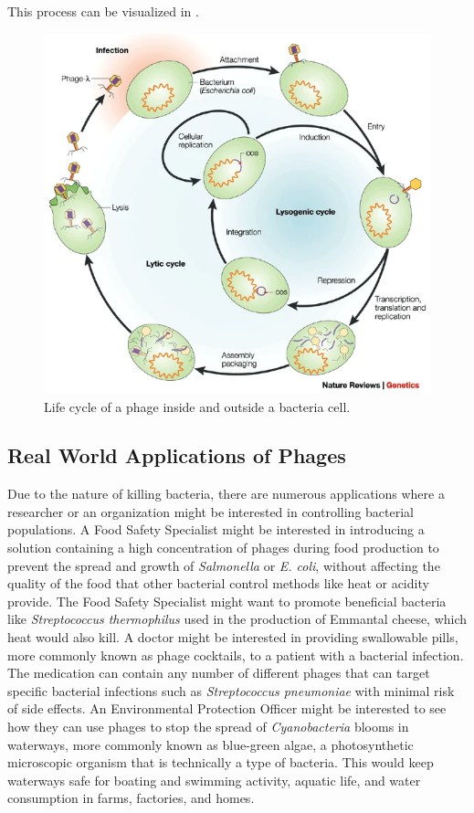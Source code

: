 This process can be visualized in . \cite{campbellFutureBacteriophageBiology2003}
\begin{figure}
    \centering
    \includegraphics[width=0.5\linewidth]{Chapters/Figures/phage_life_cycle.png}
    \caption{Life cycle of a phage inside and outside a bacteria cell.}
    \label{fig:phage_life_cycle}
\end{figure}

\subsection{Real World Applications of Phages}
Due to the nature of killing bacteria, there are numerous applications where a researcher or an organization might be interested in controlling bacterial populations. A Food Safety Specialist might be interested in introducing a solution containing a high concentration of phages during food production to prevent the spread and growth of \textit{Salmonella} or \textit{E. coli}, without affecting the quality of the food that other bacterial control methods like heat or acidity provide. The Food Safety Specialist might want to promote beneficial bacteria like \textit{Streptococcus thermophilus} used in the production of Emmantal cheese, which heat would also kill. A doctor might be interested in providing swallowable pills, more commonly known as phage cocktails, to a patient with a bacterial infection. The medication can contain any number of different phages that can target specific bacterial infections such as \textit{Streptococcus pneumoniae} with minimal risk of side effects. An Environmental Protection Officer might be interested to see how they can use phages to stop the spread of \textit{Cyanobacteria} blooms in waterways, more commonly known as blue-green algae, a photosynthetic microscopic organism that is technically a type of bacteria. This would keep waterways safe for boating and swimming activity, aquatic life, and water consumption in farms, factories, and homes. 


